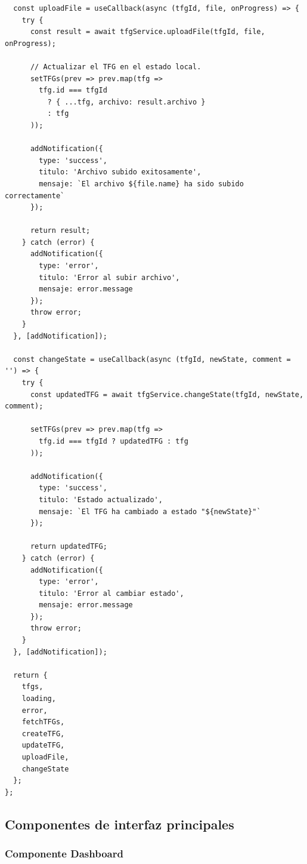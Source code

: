 \documentclass[12pt,a4paper,oneside]{report}
\begin{document}
\begin{lstlisting}
  const uploadFile = useCallback(async (tfgId, file, onProgress) => {
    try {
      const result = await tfgService.uploadFile(tfgId, file, onProgress);
      
      // Actualizar el TFG en el estado local.
      setTFGs(prev => prev.map(tfg => 
        tfg.id === tfgId 
          ? { ...tfg, archivo: result.archivo }
          : tfg
      ));
      
      addNotification({
        type: 'success',
        titulo: 'Archivo subido exitosamente',
        mensaje: `El archivo ${file.name} ha sido subido correctamente`
      });
      
      return result;
    } catch (error) {
      addNotification({
        type: 'error',
        titulo: 'Error al subir archivo',
        mensaje: error.message
      });
      throw error;
    }
  }, [addNotification]);

  const changeState = useCallback(async (tfgId, newState, comment = '') => {
    try {
      const updatedTFG = await tfgService.changeState(tfgId, newState, comment);
      
      setTFGs(prev => prev.map(tfg => 
        tfg.id === tfgId ? updatedTFG : tfg
      ));
      
      addNotification({
        type: 'success',
        titulo: 'Estado actualizado',
        mensaje: `El TFG ha cambiado a estado "${newState}"`
      });
      
      return updatedTFG;
    } catch (error) {
      addNotification({
        type: 'error',
        titulo: 'Error al cambiar estado',
        mensaje: error.message
      });
      throw error;
    }
  }, [addNotification]);

  return {
    tfgs,
    loading,
    error,
    fetchTFGs,
    createTFG,
    updateTFG,
    uploadFile,
    changeState
  };
};
\end{lstlisting}

\subsection{Componentes de interfaz
principales}\label{componentes-de-interfaz-principales}

\subsubsection{Componente Dashboard}\label{componente-dashboard}
\end{document}
